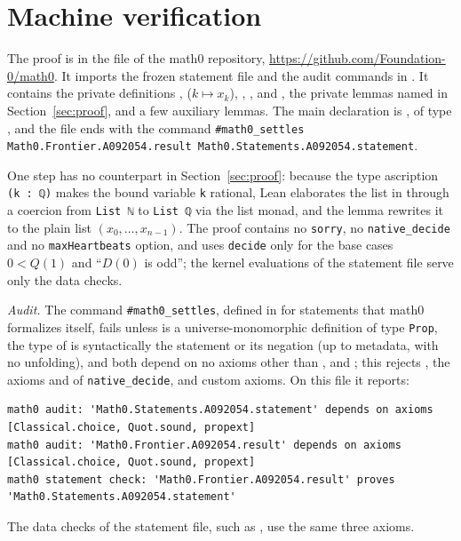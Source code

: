 \documentclass[11pt]{amsart}
\theoremstyle{plain}
\theoremstyle{definition}
\begin{document}
\section{Machine verification}\label{sec:lean}

The proof is in the file  of the math0 repository, \url{https://github.com/Foundation-0/math0}. It imports the frozen statement file and the audit commands in . It contains the private definitions ,  ($k\mapsto x_k$), , ,  and , the private lemmas named in Section~\ref{sec:proof}, and a few auxiliary lemmas. The main declaration is , of type , and the file ends with the command \texttt{\#math0\_settles Math0.Frontier.A092054.result Math0.Statements.A092054.statement}.

One step has no counterpart in Section~\ref{sec:proof}: because the type ascription \texttt{(k : ℚ)} makes the bound variable \texttt{k} rational, Lean elaborates the list in  through a coercion from \texttt{List ℕ} to \texttt{List ℚ} via the list monad, and the lemma  rewrites it to the plain list $(x_0,\dots,x_{n-1})$. The proof contains no \texttt{sorry}, no \texttt{native\_decide} and no \texttt{maxHeartbeats} option, and uses \texttt{decide} only for the base cases $0<Q(1)$ and ``$D(0)$ is odd''; the kernel evaluations of the statement file serve only the data checks.

\emph{Audit.} The command \texttt{\#math0\_settles}, defined in  for statements that math0 formalizes itself, fails unless  is a universe-monomorphic definition of type \texttt{Prop}, the type of  is syntactically the statement or its negation (up to metadata, with no unfolding), and both depend on no axioms other than ,  and ; this rejects , the axioms  and  of \texttt{native\_decide}, and custom axioms. On this file it reports:
\begin{lstlisting}[basicstyle=\ttfamily\scriptsize]
math0 audit: 'Math0.Statements.A092054.statement' depends on axioms [Classical.choice, Quot.sound, propext]
math0 audit: 'Math0.Frontier.A092054.result' depends on axioms [Classical.choice, Quot.sound, propext]
math0 statement check: 'Math0.Frontier.A092054.result' proves 'Math0.Statements.A092054.statement'
\end{lstlisting}
The data checks of the statement file, such as , use the same three axioms.
\end{document}
